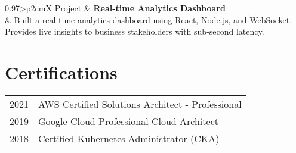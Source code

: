 \documentclass[a4paper, oneside, final]{scrartcl} %
\newcommand{\gray}{\rowcolor[gray]{.90}} %
\begin{document}
\begin{center}
\vspace{12pt}

\begin{tabularx}{0.97\linewidth}{>{\raggedleft\scshape}p{2cm}X}
\gray Project & \textbf{Real-time Analytics Dashboard}\\
       & Built a real-time analytics dashboard using React, Node.js, and WebSocket. Provides live insights to business stakeholders with sub-second latency.\\
\end{tabularx}


\section{Certifications}

\begin{tabularx}{0.97\linewidth}{>{\raggedleft\scshape}p{2cm}X}
\gray 2021 & AWS Certified Solutions Architect - Professional\\
\gray 2019 & Google Cloud Professional Cloud Architect\\
\gray 2018 & Certified Kubernetes Administrator (CKA)\\
\end{tabularx}


\end{center}
\end{document}
